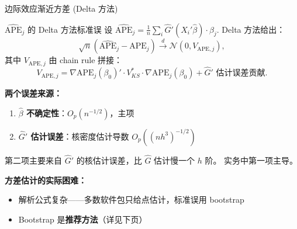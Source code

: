 \documentclass[aspectratio=169, 10pt]{beamer}
\begin{document}
\begin{frame}[shrink=12]{边际效应渐近方差 (Delta 方法)}

  \begin{definitionbox}{{$\widehat{\text{APE}}_j$ 的 Delta 方法标准误}}
    设 $\widehat{\text{APE}}_j = \tfrac{1}{n}\sum_i \hat G'(X_i'\hat\beta) \cdot \hat\beta_j$.
    Delta 方法给出：
    $$\sqrt{n}(\widehat{\text{APE}}_j - \text{APE}_j) \overset{d}{\to}
    \mathcal{N}(0, V_{\text{APE}, j}),$$
    其中 $V_{\text{APE}, j}$ 由 chain rule 拼接：
    $$V_{\text{APE}, j} = \nabla \text{APE}_j(\beta_0)' \cdot V^{*}_{KS} \cdot \nabla \text{APE}_j(\beta_0)
    + \text{$\hat G'$ 估计误差贡献}.$$
  \end{definitionbox}

  \begin{highlightbox}
    \textbf{两个误差来源：}
    \begin{enumerate}\setlength{\itemsep}{1pt}
      \item \textbf{$\hat\beta$ 不确定性}：$O_p(n^{-1/2})$，主项
      \item \textbf{$\hat G'$ 估计误差}：核密度估计导数 $O_p((nh^3)^{-1/2})$
    \end{enumerate}

    第二项主要来自 $\hat G'$ 的核估计误差，比 $\hat G$ 估计慢一个 $h$ 阶。
    实务中第一项主导。
  \end{highlightbox}

  \begin{keybox}
    \textbf{方差估计的实际困难：}
    \begin{itemize}\setlength{\itemsep}{1pt}
      \item 解析公式复杂——多数软件包只给点估计，标准误用 bootstrap
      \item Bootstrap 是\textbf{推荐方法}（详见下页）
    \end{itemize}
  \end{keybox}

\end{frame}
\end{document}
